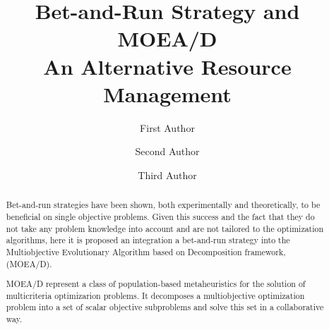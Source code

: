 \documentclass[runningheads]{llncs}
\begin{document}
%
\title{Bet-and-Run Strategy and MOEA/D \\ An Alternative Resource Management}
%
%
\author{First Author \and
Second Author \and
Third Author}
%
%
%
\maketitle              %
%
\begin{abstract}
Bet-and-run strategies have been shown, both experimentally and theoretically, to be beneficial on single objective problems. Given this success and the fact that they do not take any problem knowledge into account and are not tailored to the optimization algorithms, here it is proposed an integration a bet-and-run strategy into the Multiobjective Evolutionary Algorithm based on Decomposition framework, (MOEA/D). 

MOEA/D represent a class of population-based metaheuristics for the solution of multicriteria optimizarion problems. It decomposes a multiobjective optimization problem into a set of scalar objective subproblems and solve this set in a collaborative way. 

\end{abstract}
%
%
%

 






 
\end{document}
